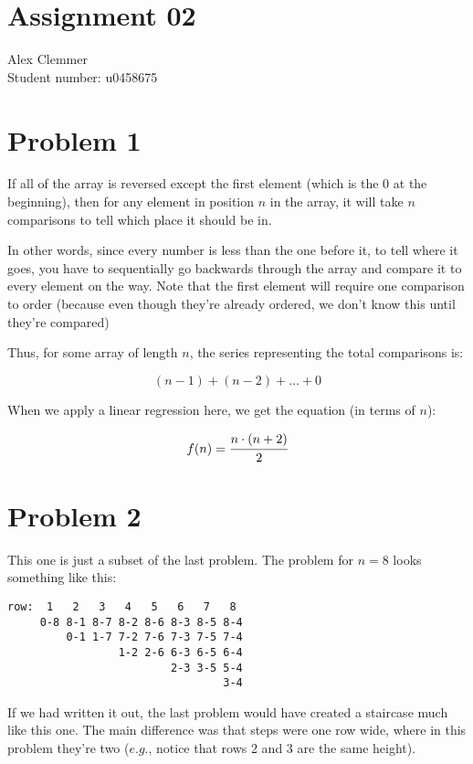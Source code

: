 \documentclass[a4paper]{article}
\begin{document}
\section*{Assignment 02}
Alex Clemmer\\
Student number: u0458675

\section*{Problem 1}

If all of the array is reversed except the first element (which is the 0 at the beginning), then for any element in position $n$ in the array, it will take $n$ comparisons to tell which place it should be in.

In other words, since every number is less than the one before it, to tell where it goes, you have to sequentially go backwards through the array and compare it to every element on the way. Note that the first element will require one comparison to order (because even though they're already ordered, we don't know this until they're compared)

Thus, for some array of length $n$, the series representing the total comparisons is:

\begin{equation*}
(n-1)+(n-2) + \dots + 0
\end{equation*}

When we apply a linear regression here, we get the equation (in terms of $n$):

\begin{equation}
f(n) = \cfrac{n \cdot (n+2)}{2}
\end{equation}

\section*{Problem 2}

This one is just a subset of the last problem. The problem for $n=8$ looks something like this:

\begin{verbatim}
row:  1   2   3   4   5   6   7   8
     0-8 8-1 8-7 8-2 8-6 8-3 8-5 8-4
         0-1 1-7 7-2 7-6 7-3 7-5 7-4
                 1-2 2-6 6-3 6-5 6-4 
                         2-3 3-5 5-4
                                 3-4
\end{verbatim}

If we had written it out, the last problem would have created a staircase much like this one. The main difference was that steps were one row wide, where in this problem they're two ($\textit{e.g.}$, notice that rows 2 and 3 are the same height).
\end{document}
